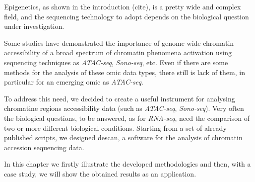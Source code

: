 
Epigenetics, as shown in the introduction (cite), is a pretty wide and complex field, and the sequencing technology to adopt depends on the biological question under investigation.

Some studies \cite{Koberstein2018, Auerbach2009} have demonstrated the importance of genome-wide chromatin accessibility of a broad spectrum of chromatin phenomena activation using sequencing techniques as \textit{ATAC-seq}, \textit{Sono-seq}, etc.
Even if there are some methods for the analysis of these omic data types, there still is lack of them, in particular for an emerging omic as \textit{ATAC-seq}.

To address this need, we decided to create a useful instrument for analysing chromatine regions accessibility data (such as \textit{ATAC-seq}, \textit{Sono-seq}).
Very often the biological questions, to be answered, as for \textit{RNA-seq}, need the comparison of two or more different biological conditions.
Starting from a set of already published \cite{Koberstein2018} scripts, we designed \gls{descan}, a software for the analysis of chromatin accession sequencing data.

In this chapter we firstly illustrate the developed methodologies and then, with a case study, we will show the obtained results as an application.